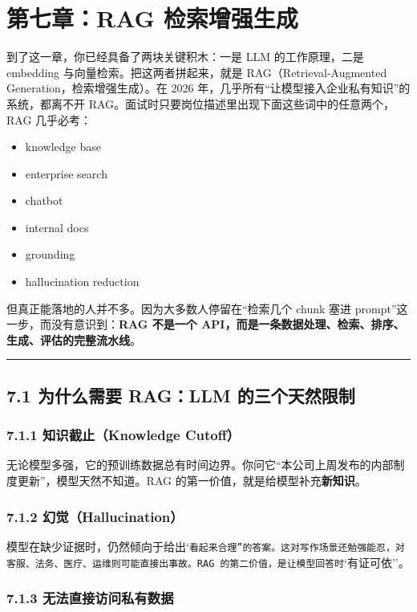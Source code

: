 \chapter{第七章：RAG 检索增强生成}

到了这一章，你已经具备了两块关键积木：一是 LLM 的工作原理，二是 embedding 与向量检索。把这两者拼起来，就是 RAG（Retrieval-Augmented Generation，检索增强生成）。在 2026 年，几乎所有``让模型接入企业私有知识''的系统，都离不开 RAG。面试时只要岗位描述里出现下面这些词中的任意两个，RAG 几乎必考：


\begin{itemize}[leftmargin=2em]
\item knowledge base
\item enterprise search
\item chatbot
\item internal docs
\item grounding
\item hallucination reduction
\end{itemize}

但真正能落地的人并不多。因为大多数人停留在``检索几个 chunk 塞进 prompt''这一步，而没有意识到：\textbf{RAG 不是一个 API，而是一条数据处理、检索、排序、生成、评估的完整流水线}。


\bigskip\hrule\bigskip

\section{7.1 为什么需要 RAG：LLM 的三个天然限制}

\subsection{7.1.1 知识截止（Knowledge Cutoff）}

无论模型多强，它的预训练数据总有时间边界。你问它``本公司上周发布的内部制度更新''，模型天然不知道。RAG 的第一价值，就是给模型补充\textbf{新知识}。


\subsection{7.1.2 幻觉（Hallucination）}

模型在缺少证据时，仍然倾向于给出`\texttt{看起来合理''的答案。这对写作场景还勉强能忍，对客服、法务、医疗、运维则可能直接出事故。RAG 的第二价值，是让模型回答时}`有证可依''。


\subsection{7.1.3 无法直接访问私有数据}

